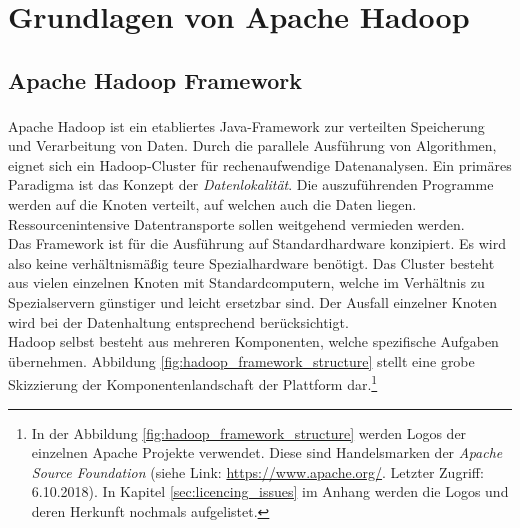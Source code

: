 \chapter{Grundlagen von Apache Hadoop\textsuperscript{\textregistered}}
\label{ch:theory_hadoop}

\section{Apache Hadoop Framework}
\label{sec:theory_hadoop}
\noindent
Apache Hadoop\textsuperscript{\textregistered} ist ein etabliertes Java-Framework zur verteilten Speicherung und Verarbeitung von Daten. Durch die parallele Ausführung von Algorithmen, eignet sich ein Hadoop-Cluster für rechenaufwendige Datenanalysen. Ein primäres Paradigma ist das Konzept der \textit{Datenlokalität}. Die auszuführenden Programme werden auf die Knoten verteilt, auf welchen auch die Daten liegen. Ressourcenintensive Datentransporte sollen weitgehend vermieden werden.\cite[S. 20 ff.]{big_data_praxis}\\ 
Das Framework ist für die Ausführung auf Standardhardware konzipiert. Es wird also keine verhältnismäßig teure Spezialhardware benötigt. Das Cluster besteht aus vielen einzelnen Knoten mit Standardcomputern, welche im Verhältnis zu Spezialservern günstiger und leicht ersetzbar sind. Der Ausfall einzelner Knoten wird bei der Datenhaltung entsprechend berücksichtigt. \\

\noindent
Hadoop selbst besteht aus mehreren Komponenten, welche spezifische Aufgaben übernehmen. Abbildung \ref{fig:hadoop_framework_structure} stellt eine grobe Skizzierung der Komponentenlandschaft der Plattform dar.\footnote{In der Abbildung \ref{fig:hadoop_framework_structure} werden Logos der einzelnen Apache Projekte verwendet. Diese sind Handelsmarken der \textit{Apache Source Foundation} (siehe Link: \url{https://www.apache.org/}. Letzter Zugriff: 6.10.2018). In Kapitel \ref{sec:licencing_issues} im Anhang werden die Logos und deren Herkunft nochmals aufgelistet.}\\

